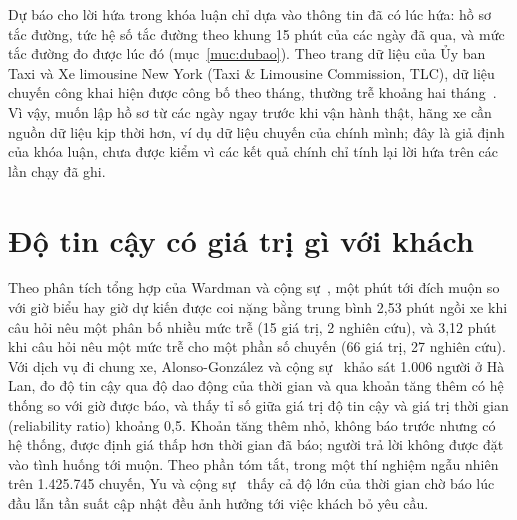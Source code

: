 Dự báo cho lời hứa trong khóa luận chỉ dựa vào thông tin đã có lúc hứa: hồ sơ tắc đường, tức hệ số tắc đường theo
khung 15 phút của các ngày đã qua, và mức tắc đường đo được lúc đó (mục~\ref{muc:dubao}). Theo trang dữ liệu của Ủy
ban Taxi và Xe limousine New York (Taxi \& Limousine Commission, TLC), dữ liệu chuyến công khai hiện được công bố theo
tháng, thường trễ khoảng hai tháng~\cite{tlc}. Vì vậy, muốn lập hồ sơ từ các ngày ngay trước khi vận hành thật, hãng
xe cần nguồn dữ liệu kịp thời hơn, ví dụ dữ liệu chuyến của chính mình; đây là giả định của khóa luận, chưa được kiểm
vì các kết quả chính chỉ tính lại lời hứa trên các lần chạy đã ghi.

\section{Độ tin cậy có giá trị gì với khách}
\label{muc:c2-giatri}

Theo phân tích tổng hợp của Wardman và cộng sự~\cite{wardman2026}, một phút tới đích muộn so với giờ biểu hay giờ dự
kiến được coi nặng bằng trung bình 2,53 phút ngồi xe khi câu hỏi nêu một phân bố nhiều mức trễ (15 giá trị, 2
nghiên cứu), và 3,12 phút khi câu hỏi nêu một mức trễ cho một phần số chuyến (66 giá trị, 27 nghiên cứu). Với
dịch vụ đi chung xe, Alonso-González và cộng sự~\cite{alonsogonzalez2020} khảo sát 1.006 người ở Hà Lan, đo độ tin cậy
qua độ dao động của thời gian và qua khoản tăng thêm có hệ thống so với giờ được báo, và thấy tỉ số giữa giá trị độ
tin cậy và giá trị thời gian (reliability ratio) khoảng 0,5. Khoản tăng thêm nhỏ, không báo trước nhưng có hệ thống,
được định giá thấp hơn thời gian đã báo; người trả lời không được đặt vào tình huống tới muộn. Theo phần tóm tắt, trong
một thí nghiệm ngẫu nhiên trên 1.425.745 chuyến, Yu và cộng sự~\cite{yu2022} thấy cả độ lớn của thời gian chờ báo lúc
đầu lẫn tần suất cập nhật đều ảnh hưởng tới việc khách bỏ yêu cầu.

